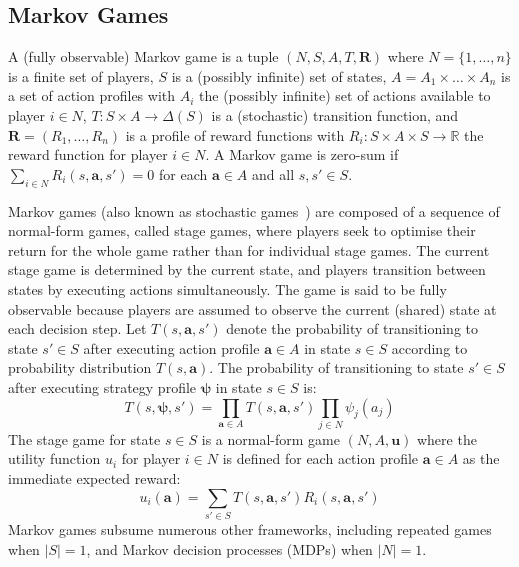 \documentclass[10pt]{article}
\theoremstyle{plain}
\newcommand{\vect}[1]{\bm{#1}}
\begin{document}
\subsection{Markov Games}
A (fully observable) Markov game is a tuple $(N, S, A, T, \vect{R})$ where
$N = \{ 1, \dots, n \}$ is a finite set of players,
$S$ is a (possibly infinite) set of states,
$A = A_{1} \times \dots \times A_{n}$ is a set of action profiles with $A_{i}$ the (possibly infinite) set of actions available to player $i \in N$,
$T : S \times A \to \Delta(S)$ is a (stochastic) transition function, and
$\vect{R} = (R_{1}, \dots, R_{n})$ is a profile of reward functions with $R_{i} : S \times A \times S \to \mathbb{R}$ the reward function for player $i \in N$.
A Markov game is zero-sum if $\sum_{i \in N} R_{i}(s, \vect{a}, s') = 0$ for each $\vect{a} \in A$ and all $s, s' \in S$.

Markov games (also known as stochastic games~\cite{Shapley:PNAS:1953}) are composed of a sequence of normal-form games, called stage games, where players seek to optimise their return for the whole game rather than for individual stage games.
The current stage game is determined by the current state, and players transition between states by executing actions simultaneously.
The game is said to be fully observable because players are assumed to observe the current (shared) state at each decision step.
Let $T(s, \vect{a}, s')$ denote the probability of transitioning to state $s' \in S$ after executing action profile $\vect{a} \in A$ in state $s \in S$ according to probability distribution $T(s, \vect{a})$.
The probability of transitioning to state $s' \in S$ after executing strategy profile $\vect{\psi}$ in state $s \in S$ is:
\begin{equation*}
    T(s, \vect{\psi}, s') = \prod_{\vect{a} \in A} T(s, \vect{a}, s') \prod_{j \in N} \psi_{j}(a_{j})
\end{equation*}
The stage game for state $s \in S$ is a normal-form game $(N, A, \vect{u})$ where the utility function $u_{i}$ for player $i \in N$ is defined for each action profile $\vect{a} \in A$ as the immediate expected reward:
\begin{equation*}
    u_{i}(\vect{a}) = \sum_{s' \in S} T(s, \vect{a}, s') R_{i}(s, \vect{a}, s')
\end{equation*}
Markov games subsume numerous other frameworks, including repeated games when $|S| = 1$, and Markov decision processes (MDPs) when $|N| = 1$.
\end{document}
